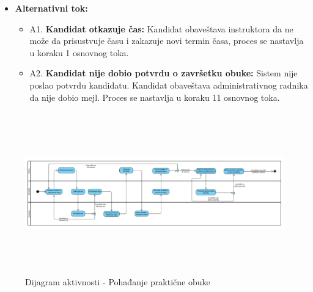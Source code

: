 \begin{itemize}
\item \textbf{Alternativni tok:}  
   \begin{itemize}
   \item A1. \textbf{Kandidat otkazuje čas:}
  Kandidat obaveštava instruktora da ne može da prisustvuje času i zakazuje novi termin časa, proces se nastavlja u koraku 1 osnovnog toka.
  \item A2. \textbf{Kandidat nije dobio potvrdu o završetku obuke:}
  Sistem nije poslao potvrdu kandidatu. Kandidat obaveštava administrativnog radnika da nije dobio mejl. Proces se nastavlja u koraku 11 osnovnog toka.
   \end{itemize}

\end{itemize}

\begin{figure}[H]
  \begin{center}
      \includegraphics[width=140mm, height=70mm]{Diagrams/dijagram_aktivnosti_pohadjanje_prakticne_obuke.png}
  \end{center}
  \caption {Dijagram aktivnosti - Pohađanje praktične obuke}
  \label{activity_pohadjanje_prakticne_obuke}

\end{figure}
